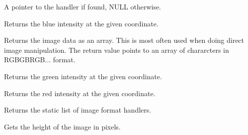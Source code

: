



A pointer to the handler if found, NULL otherwise.



\label{wximagegetblue}


Returns the blue intensity at the given coordinate.

\label{wximagegetdata}


Returns the image data as an array. This is most often used when doing
direct image manipulation. The return value points to an array of
chararcters in RGBGBRGB... format.

\label{wximagegetgreen}


Returns the green intensity at the given coordinate.

\label{wximagegetred}


Returns the red intensity at the given coordinate.



Returns the static list of image format handlers.



\label{wximagegetheight}


Gets the height of the image in pixels.

\label{wximagegetmaskblue}

